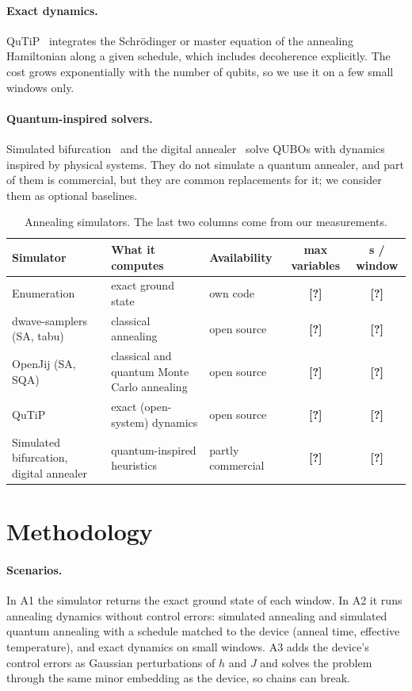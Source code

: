 \documentclass[11pt]{article}
\newcommand{\tofill}[1]{\textbf{[#1]}}
\begin{document}
\paragraph{Exact dynamics.}
QuTiP~\cite{johansson2013qutip,lambert2024qutip5} integrates the
Schr\"{o}dinger or master equation of the annealing Hamiltonian along a given
schedule, which includes decoherence explicitly. The cost grows exponentially
with the number of qubits, so we use it on a few small windows only.

\paragraph{Quantum-inspired solvers.}
Simulated bifurcation~\cite{goto2019sb} and the digital
annealer~\cite{aramon2019da} solve QUBOs with dynamics inspired by physical
systems. They do not simulate a quantum annealer, and part of them is
commercial, but they are common replacements for it; we consider them as
optional baselines.

\begin{table}[t]
\caption{Annealing simulators. The last two columns come from our measurements.}
\label{tab:sims}
\centering
\small
\begin{tabular}{lllcc}
\toprule
Simulator & What it computes & Availability & max variables & s / window \\
\midrule
Enumeration & exact ground state & own code & \tofill{?} & \tofill{?} \\
dwave-samplers (SA, tabu) & classical annealing & open source & \tofill{?} & \tofill{?} \\
OpenJij (SA, SQA) & classical and quantum Monte Carlo annealing & open source & \tofill{?} & \tofill{?} \\
QuTiP & exact (open-system) dynamics & open source & \tofill{?} & \tofill{?} \\
Simulated bifurcation, digital annealer & quantum-inspired heuristics & partly commercial & \tofill{?} & \tofill{?} \\
\bottomrule
\end{tabular}
\end{table}

\section{Methodology}

\paragraph{Scenarios.}
In A1 the simulator returns the exact ground state of each window. In A2 it
runs annealing dynamics without control errors: simulated annealing and
simulated quantum annealing with a schedule matched to the device (anneal time,
effective temperature), and exact dynamics on small windows. A3 adds the
device's control errors as Gaussian perturbations of $h$ and $J$ and solves the
problem through the same minor embedding as the device, so chains can break.
\end{document}
